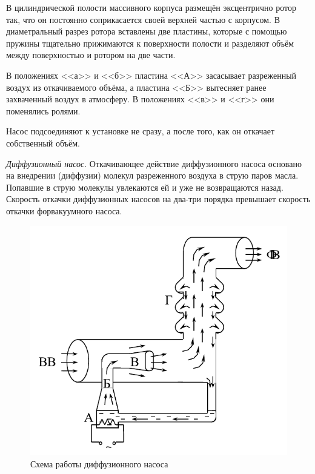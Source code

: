 \documentclass[12pt]{article}
\begin{document}
	В цилиндрической полости массивного корпуса размещён эксцентрично ротор так, что он постоянно соприкасается своей верхней частью с корпусом. В диаметральный разрез ротора вставлены две пластины, которые с помощью пружины тщательно прижимаются к поверхности полости и разделяют объём между поверхностью и ротором на две части.
	
	В положениях <<а>> и <<б>> пластина <<А>> засасывает разреженный воздух из откачиваемого объёма, а пластина <<Б>> вытесняет ранее захваченный воздух в атмосферу. В положениях <<в>> и <<г>> они поменялись ролями.
	
	Насос подсоединяют к установке не сразу, а после того, как он откачает собственный объём.
	
	\textit{Диффузионный насос}. Откачивающее действие диффузионного насоса основано на внедрении (диффузии) молекул разреженного воздуха в струю паров масла. Попавшие в струю молекулы увлекаются ей и уже не возвращаются назад. Скорость откачки диффузионных насосов на два-три порядка превышает скорость откачки форвакуумного насоса.
	
	\begin{figure}[h!]
	\caption{Схема работы диффузионного насоса}
	\label{fig:scheme-dfn}
	\begin{center}
	\includegraphics[scale=.6]{scheme2.png}
	\end{center}
	\end{figure}
	
\end{document}
